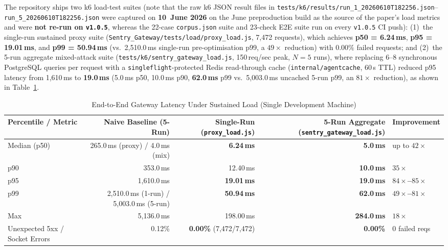 \documentclass[11pt, a4paper]{article}
\begin{document}
The repository ships two k6 load-test suites (note that the raw k6 JSON result files in \texttt{tests/k6/results/run\_1\_20260610T182256.json}--\texttt{run\_5\_20260610T182256.json} were captured on \textbf{10~June 2026} on the June preproduction build as the source of the paper's load metrics and were \textbf{not re-run on \texttt{v1.0.5}}, whereas the 22-case \texttt{corpus.json} suite and 23-check E2E suite run on every \texttt{v1.0.5} CI push): (1)~the single-run sustained proxy suite (\texttt{Sentry\_Gateway/tests/load/proxy\_load.js}, 7,472 requests), which achieves \textbf{p50 = 6.24\,ms}, \textbf{p95 = 19.01\,ms}, and \textbf{p99 = 50.94\,ms} (vs.\ 2,510.0\,ms single-run pre-optimisation p99, a $49\times$ reduction) with $0.00\%$ failed requests; and (2)~the 5-run aggregate mixed-attack suite (\texttt{tests/k6/sentry\_gateway\_load.js}, 150\,req/sec peak, $N=5$ runs), where replacing 6--8 synchronous PostgreSQL queries per request with a \texttt{singleflight}-protected Redis read-through cache (\texttt{internal/agentcache}, 60\,s TTL) reduced p95 latency from 1,610\,ms to \textbf{19.0\,ms} (5.0\,ms p50, 10.0\,ms p90, \textbf{62.0\,ms} p99 vs.\ 5,003.0\,ms uncached 5-run p99, an $81\times$ reduction), as shown in Table~\ref{tab:macro-load}.

\begin{table}[htbp]
\centering
\caption{End-to-End Gateway Latency Under Sustained Load (Single Development Machine)}
\label{tab:macro-load}
\begin{small}
\begin{tabular}{@{} l r r r l @{}}
\toprule
\textbf{Percentile / Metric} & \textbf{Naive Baseline (5-Run)} & \textbf{Single-Run (\texttt{proxy\_load.js})} & \textbf{5-Run Aggregate (\texttt{sentry\_gateway\_load.js})} & \textbf{Improvement} \\
\midrule
Median (p50) & 265.0\,ms (proxy) / 4.0\,ms (mix) & \textbf{6.24\,ms} & \textbf{5.0\,ms} & up to $42\times$ \\
p90          & 353.0\,ms                         & 12.40\,ms         & \textbf{10.0\,ms} & $35\times$ \\
p95          & 1,610.0\,ms                       & \textbf{19.01\,ms} & \textbf{19.0\,ms} & \textbf{$84\times$--$85\times$} \\
p99          & 2,510.0\,ms (1-run) / 5,003.0\,ms (5-run) & \textbf{50.94\,ms} & \textbf{62.0\,ms} & \textbf{$49\times$--$81\times$} \\
Max          & 5,136.0\,ms                       & 198.00\,ms        & \textbf{284.0\,ms} & $18\times$ \\
Unexpected 5xx / Socket Errors & 0.12\%          & \textbf{0.00\%} (7,472/7,472) & \textbf{0.00\%} & 0 failed reqs \\
\bottomrule
\end{tabular}
\end{small}
\end{table}
\end{document}
